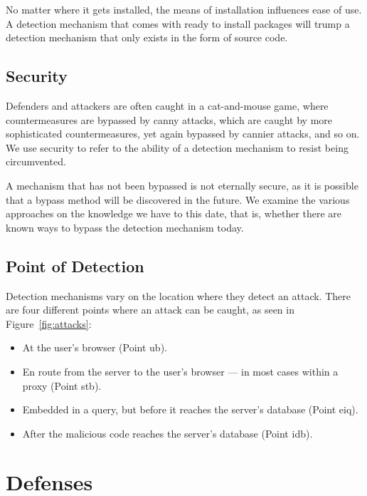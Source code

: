 \documentclass[conference]{IEEEtran}
\begin{document}
No matter where it gets installed, the means of installation influences
ease of use. A detection mechanism that comes with ready to install
packages will trump a detection mechanism that only exists in the form
of source code. 

\subsection{Security}

Defenders and attackers are often caught in a cat-and-mouse game,
where countermeasures are bypassed by canny attacks, which are caught
by more sophisticated countermeasures, yet again bypassed by cannier
attacks, and so on. We use security to refer to the ability of a
detection mechanism to resist being circumvented. 

A mechanism that has not been bypassed is not eternally secure, as it
is possible that a bypass method will be discovered in the future. We
examine the various approaches on the knowledge we have to this date,
that is, whether there are known ways to bypass the detection
mechanism today.

\subsection{Point of Detection}

Detection mechanisms vary on the location where they detect an attack.
There are four different points where an attack can be caught, as seen
in Figure~\ref{fig:attacks}:
\begin{itemize}
\item At the user's browser (Point {\sc ub}).
\item En route from the server to the user's browser --- in most cases
within a proxy (Point {\sc s}t{\sc b}).
\item Embedded in a query, but before it reaches the server's database
  (Point {\sc e}i{\sc q}).
\item After the malicious code reaches the server's database
  (Point i{\sc db}).
\end{itemize}

\section{Defenses}
\label{sec:defs}
\end{document}
